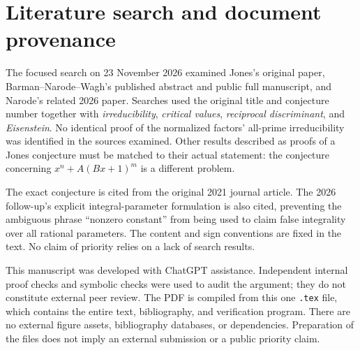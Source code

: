\documentclass[11pt,a4paper]{article}
\theoremstyle{definition}
\theoremstyle{remark}
\begin{document}
\clearpage
\section{Literature search and document provenance}\label{sec:provenance}

The focused search on 23 November 2026 examined Jones's original
paper, Barman--Narode--Wagh's published abstract and public full
manuscript, and Narode's related 2026 paper. Searches used the
original title and conjecture number together with
\emph{irreducibility}, \emph{critical values},
\emph{reciprocal discriminant}, and \emph{Eisenstein}.
No identical proof of the normalized factors' all-prime
irreducibility was identified in the sources examined. Other
results described as proofs of a Jones conjecture must be matched
to their actual statement: the conjecture concerning
$x^n+A(Bx+1)^m$ is a different problem.

The exact conjecture is cited from the original 2021 journal
article. The 2026 follow-up's explicit integral-parameter
formulation is also cited, preventing the ambiguous phrase
``nonzero constant'' from being used to claim false integrality
over all rational parameters. The content and sign conventions
are fixed in the text. No claim of priority relies on a lack of
search results.

This manuscript was developed with ChatGPT assistance. Independent
internal proof checks and symbolic checks were used to audit the
argument; they do not constitute external peer review. The PDF
is compiled from this one \texttt{.tex} file, which contains the
entire text, bibliography, and verification program. There are no
external figure assets, bibliography databases, or
\texttt{\string} dependencies. Preparation of the files does
not imply an external submission or a public priority claim.
\end{document}

